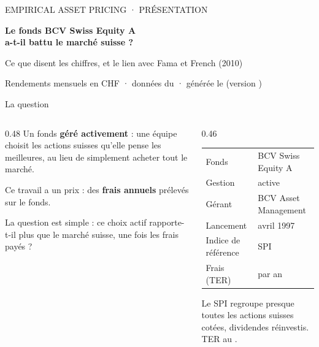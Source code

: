 \documentclass[aspectratio=169,11pt]{beamer}
\begin{document}
\begin{frame}[plain]
  \vfill
  {\color{gris}\small EMPIRICAL ASSET PRICING · PRÉSENTATION}\par\medskip
  {\color{bleu}\huge\bfseries Le fonds BCV Swiss Equity A\\[2pt] a-t-il battu le marché suisse ?}\par\medskip
  {\large Ce que disent les chiffres, et le lien avec Fama et French (2010)}\par\bigskip
  {\small\color{gris} Rendements mensuels en CHF · données du \DateDonnees{} · générée le \DateRapport{} (version \texttt{\Commit})}
  \vfill
\end{frame}

\begin{frame}{La question}
  \begin{columns}[T]
    \begin{column}{0.48\textwidth}
      Un fonds \textbf{géré activement} : une équipe choisit les actions suisses qu'elle pense les meilleures, au lieu de simplement acheter tout le marché.

      Ce travail a un prix : des \textbf{frais annuels} prélevés sur le fonds.

      \begin{cle}
        La question est simple : ce choix actif rapporte-t-il plus que le marché suisse, une fois les frais payés ?
      \end{cle}
    \end{column}
    \begin{column}{0.46\textwidth}
      \footnotesize
      \begin{tabular}{@{}ll@{}}
        \toprule
        Fonds & BCV Swiss Equity A \\
        Gestion & active \\
        Gérant & BCV Asset Management \\
        Lancement & avril 1997 \\
        Indice de référence & SPI \\
        Frais (TER) & \TER{} par an \\
        \bottomrule
      \end{tabular}\par\medskip
      {\scriptsize\color{gris} Le SPI regroupe presque toutes les actions suisses cotées, dividendes réinvestis. TER au \TERDate.}
    \end{column}
  \end{columns}
\end{frame}
\end{document}
